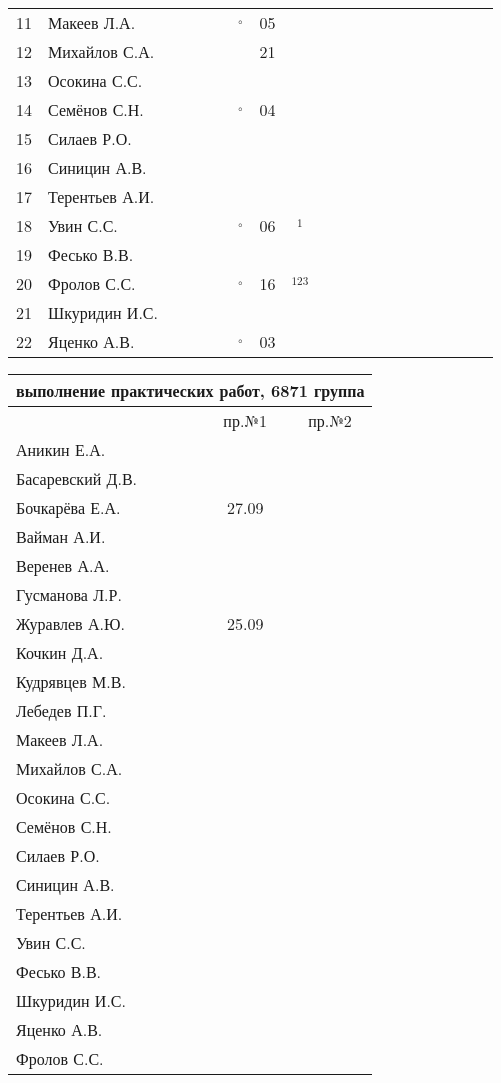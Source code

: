 \documentclass[a4paper,11pt]{article}
\newcommand*\OK{&\small \ding{51}$\!\!_\circ$} %
\newcommand*\ok{&{\small \ding{51}}} %
\newcommand*\no{&{\small }} %
\newcommand*\da{&{\small\ding{48}$\!\!_1$}} %
\newcommand*\dabc{&{\small\ding{48}$\!\!_{123}$}} %
\begin{document}
\begin{tabular}{l|l|cccccccccccccccccc}
11&Макеев Л.А.     \ok\ok\ok\ok\OK&05\ok  &&&&&&&&&&&\\
12&Михайлов С.А.   \no\no\ok\ok\ok&21\no  &&&&&&&&&&&\\
13&Осокина С.С.    \ok\ok\ok\ok\no\no\ok  &&&&&&&&&&&\\
14&Семёнов С.Н.    \ok\ok\ok\ok\OK&04\ok  &&&&&&&&&&&\\
15&Силаев Р.О.     \ok\ok\no\no\no\no\no  &&&&&&&&&&&\\
16&Синицин А.В.    \ok\ok\no\ok\no\no\no  &&&&&&&&&&&\\
17&Терентьев А.И.  \ok\ok\ok\ok\no\no\no  &&&&&&&&&&&\\
18&Увин С.С.       \ok\ok\ok\ok\OK&06\da  &&&&&&&&&&&\\
19&Фесько В.В.     \no\no\no\no\no\no\no  &&&&&&&&&&&\\
20&Фролов С.С.     \ok\ok\ok\ok\OK&16\dabc&&&&&&&&&&&\\ 
21&Шкуридин И.С.   \ok\ok\ok\ok\ok\no\ok  &&&&&&&&&&&\\
22&Яценко А.В.     \ok\ok\ok\ok\OK&03\ok  &&&&&&&&&&&\\ 
\bottomrule
\end{tabular} 
\newpage

\begin{tabular}{l|cc}
\multicolumn{3}{c}{выполнение практических работ, 6871 группа} \\
\toprule
& пр.№1 & пр.№2 \\
\midrule
Аникин Е.А.     &     &\\    
Басаревский Д.В.&     &\\
Бочкарёва Е.А.  &27.09&\\
Вайман А.И.     &     &\\
Веренев А.А.    &     &\\
Гусманова Л.Р.  &     &\\
Журавлев А.Ю.   &25.09&\\
Кочкин Д.А.     &     &\\
Кудрявцев М.В.  &     &\\
Лебедев П.Г.    &     &\\
Макеев Л.А.     &     &\\
Михайлов С.А.   &     &\\
Осокина С.С.    &     &\\
Семёнов С.Н.    &     &\\
Силаев Р.О.     &     &\\
Синицин А.В.    &     &\\
Терентьев А.И.  &     &\\
Увин С.С.       &     &\\
Фесько В.В.     &     &\\
Шкуридин И.С.   &     &\\
Яценко А.В.     &     &\\
Фролов С.С.     &     &\\
\bottomrule
\end{tabular}
\end{document}
